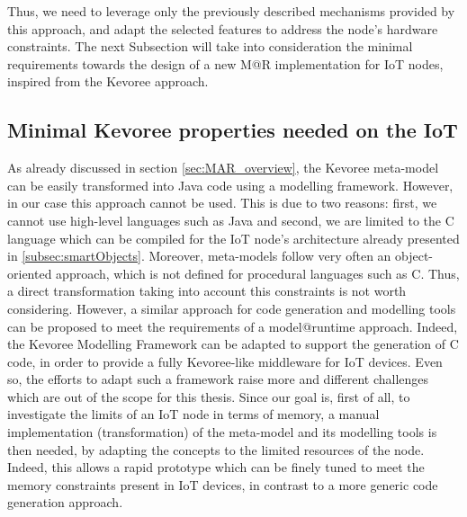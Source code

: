 
Thus, we need to leverage only the previously described mechanisms provided by this approach, and adapt the selected features to address the node's hardware constraints.
The next Subsection will take into consideration the minimal requirements towards the design of a new M@R implementation for IoT nodes, inspired from the Kevoree approach.


\subsection{Minimal Kevoree properties needed on the IoT}
\label{subsec:minKevProp}
As already discussed in section \ref{sec:MAR_overview}, the Kevoree meta-model can be easily transformed into Java code using a modelling framework.
However, in our case this approach cannot be used.
This is due to two reasons: first, we cannot use high-level languages such as Java and second, we are limited to the C language which can be compiled for the IoT node's architecture already presented in \ref{subsec:smartObjects}.
Moreover, meta-models follow very often an object-oriented approach, which is not defined for procedural languages such as C.
Thus, a direct transformation taking into account this constraints is not worth considering.
However, a similar approach for code generation and modelling tools can be proposed to meet the requirements of a model@runtime approach.
Indeed, the Kevoree Modelling Framework \cite{fouquet2012eclipse} can be adapted to support the generation of C code, in order to provide a fully Kevoree-like middleware for IoT devices.
Even so, the efforts to adapt such a framework raise more and different challenges which are out of the scope for this thesis.
Since our goal is, first of all, to investigate the limits of an IoT node in terms of memory, a manual implementation (transformation) of the meta-model and its modelling tools is then needed, by adapting the concepts to the limited resources of the node.
Indeed, this allows a rapid prototype which can be finely tuned to meet the memory constraints present in IoT devices, in contrast to a more generic code generation approach.

